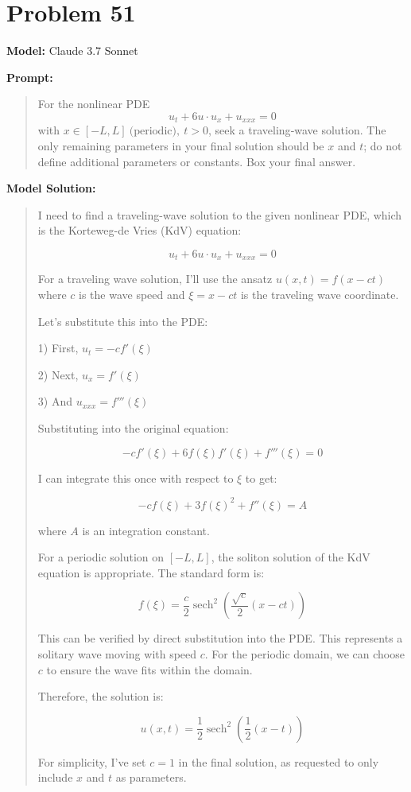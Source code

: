 \documentclass{article}
\begin{document}
\section*{Problem 51}
\textbf{Model:} Claude 3.7 Sonnet

\textbf{Prompt:}
\begin{quote}
For the nonlinear PDE $$u_t + 6u\cdot u_x + u_{xxx} = 0$$ with $x\in [-L,L] \ \text{(periodic)}, \ t>0$, seek a traveling‐wave solution. The only remaining parameters in your final solution should be $x$ and $t$; do not define additional parameters or constants. Box your final answer.
\end{quote}
\textbf{Model Solution:}
\begin{quote}
I need to find a traveling-wave solution to the given nonlinear PDE, which is the Korteweg-de Vries (KdV) equation:



$$u_t + 6u\cdot u_x + u_{xxx} = 0$$



For a traveling wave solution, I'll use the ansatz $u(x,t) = f(x-ct)$ where $c$ is the wave speed and $\xi = x-ct$ is the traveling wave coordinate.



Let's substitute this into the PDE:



1) First, $u_t = -c f'(\xi)$

2) Next, $u_x = f'(\xi)$

3) And $u_{xxx} = f'''(\xi)$



Substituting into the original equation:

$$-c f'(\xi) + 6f(\xi)f'(\xi) + f'''(\xi) = 0$$



I can integrate this once with respect to $\xi$ to get:

$$-c f(\xi) + 3f(\xi)^2 + f''(\xi) = A$$



where $A$ is an integration constant.



For a periodic solution on $[-L,L]$, the soliton solution of the KdV equation is appropriate. The standard form is:

$$f(\xi) = \frac{c}{2}\operatorname{sech}^2\left(\frac{\sqrt{c}}{2}(x-ct)\right)$$



This can be verified by direct substitution into the PDE. This represents a solitary wave moving with speed $c$. For the periodic domain, we can choose $c$ to ensure the wave fits within the domain.



Therefore, the solution is:



$$\boxed{u(x,t) = \frac{1}{2}\operatorname{sech}^2\left(\frac{1}{2}(x-t)\right)}$$



For simplicity, I've set $c=1$ in the final solution, as requested to only include $x$ and $t$ as parameters.
\end{quote}
\end{document}

